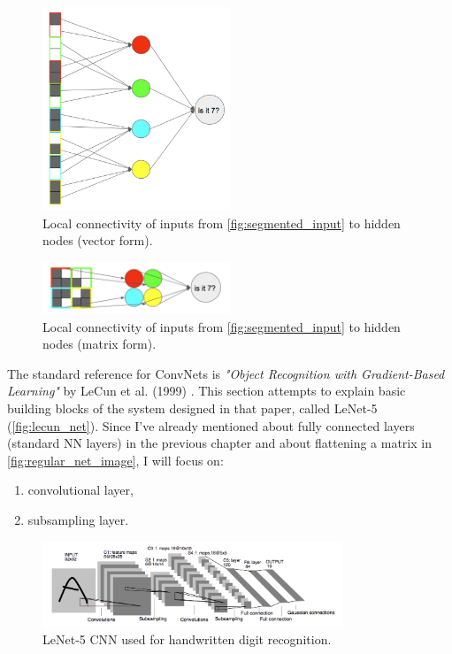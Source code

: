 \documentclass[11pt]{article}
\begin{document}
\begin{figure}[h]
\includegraphics[width=0.5\textwidth]{cnn_column}
\centering
\caption{Local connectivity of inputs from \autoref{fig:segmented_input} to hidden nodes (vector form).}
\label{fig:cnn_column}
\end{figure}

\begin{figure}[h]
\includegraphics[width=0.5\textwidth]{cnn_spacial}
\centering
\caption{Local connectivity of inputs from \autoref{fig:segmented_input} to hidden nodes (matrix form).}
\label{fig:cnn_spacial}
\end{figure}

The standard reference for ConvNets is \textit{"Object Recognition with Gradient-Based Learning"} by LeCun et al. (1999) \cite{lecun_object}. This section attempts to explain basic building blocks of the system designed in that paper, called LeNet-5 (\autoref{fig:lecun_net}). Since I've already mentioned about fully connected layers (standard NN layers) in the previous chapter and about flattening a matrix in \autoref{fig:regular_net_image}, I will focus on:
\begin{enumerate}[1)]
\item convolutional layer,
\item subsampling layer.
\end{enumerate}

\begin{figure}[h]
\includegraphics[width=0.8\textwidth]{lecun_net}
\centering
\caption{LeNet-5 CNN \cite{lecun_object} used for handwritten digit recognition.}
\label{fig:lecun_net}
\end{figure}
\end{document}
